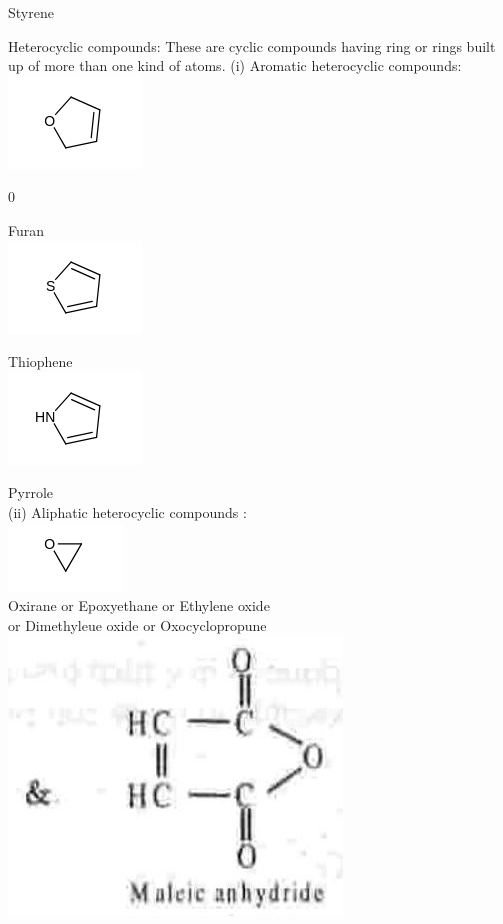 \documentclass[10pt]{article}
\begin{document}
Styrene

Heterocyclic compounds: These are cyclic compounds having ring or rings built up of more than one kind of atoms. (i) Aromatic heterocyclic compounds:\\
\includegraphics{smile-9cbae8d5125cbb289b0a7eff2c8662600611a900}

0

Furan\\
\includegraphics{smile-973b47a7aac7ee80f3b67534bec681239d52a03e}

Thiophene\\
\includegraphics{smile-ea8e0f86c256c71badee4915a8d503c76dca70a2}

Pyrrole\\
(ii) Aliphatic heterocyclic compounds :\\
\includegraphics{smile-531b6b3f236341a3a4ca3a32a7f85321f69d5c97}\\
Oxirane or Epoxyethane or Ethylene oxide\\
or Dimethyleue oxide or Oxocyclopropune\\
\includegraphics[max width=\textwidth, center]{2025_01_28_8470952b98110cec3aabg-008(1)}
\end{document}
